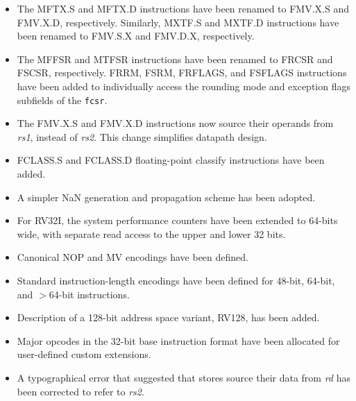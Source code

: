 \begin{itemize}
\item The MFTX.S and MFTX.D instructions have been renamed to FMV.X.S and
FMV.X.D, respectively.  Similarly, MXTF.S and MXTF.D instructions have been
renamed to FMV.S.X and FMV.D.X, respectively.
\item The MFFSR and MTFSR instructions have been renamed to FRCSR and FSCSR,
respectively.  FRRM, FSRM, FRFLAGS, and FSFLAGS instructions have been added
to individually access the rounding mode and exception flags subfields of
the {\tt fcsr}.
\item The FMV.X.S and FMV.X.D instructions now source their operands
from {\em rs1}, instead of {\em rs2}.  This change simplifies datapath
design.
\item FCLASS.S and FCLASS.D floating-point classify instructions have been
added.
\item A simpler NaN generation and propagation scheme has been
  adopted.
\item For RV32I, the system performance counters have been extended to
  64-bits wide, with separate read access to the upper and lower 32 bits.
\item Canonical NOP and MV encodings have been defined.
\item Standard instruction-length encodings have been defined for 48-bit,
  64-bit, and $>$64-bit instructions.
\item Description of a 128-bit address space variant, RV128, has been added.
\item Major opcodes in the 32-bit base instruction format have been
  allocated for user-defined custom extensions.
\item A typographical error that suggested that stores source their
  data from {\em rd} has been corrected to refer to {\em rs2}.
\end{itemize}
\vspace{-0.1in}
